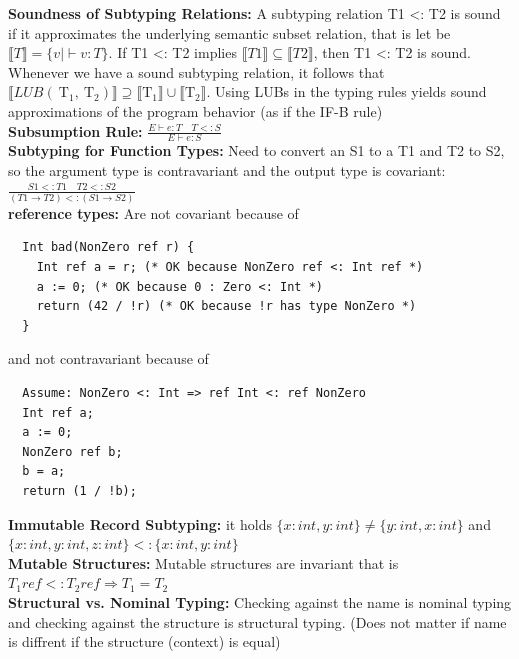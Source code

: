 \documentclass[10pt,landscape]{article}
\begin{document}
\begin{multicols}{3}
\textbf{Soundness of Subtyping Relations:} A subtyping relation T1 <: T2 is sound if it approximates the underlying
semantic subset relation, that is let be $\llbracket T \rrbracket=\{v \mid \vdash v: T\}$. If T1 <: T2 implies $\llbracket T1 \rrbracket \subseteq  \llbracket T2 \rrbracket$, then T1 <: T2 is sound.
Whenever we have a sound subtyping relation, it follows that $\llbracket L U B\left(\mathrm{~T}_1, \mathrm{~T}_2\right) \rrbracket \supseteq \llbracket \mathrm{T}_1 \rrbracket \cup \llbracket \mathrm{T}_2 \rrbracket$.
Using LUBs in the typing rules yields sound approximations of the program behavior (as if the IF-B rule)\\
\textbf{Subsumption Rule:} $\frac{E \vdash e : T \quad  T <:  S}{E \vdash e : S}$\\
\textbf{Subtyping for Function Types:} Need to convert an S1 to a T1 and T2 to S2, so the argument type is
contravariant and the output type is covariant: $\frac{S1 <: T1 \quad T2 <: S2}{(T1 \rightarrow T2) <: (S1 \rightarrow S2)}$\\
\textbf{reference types:} Are not covariant because of 
\begin{verbatim}
  Int bad(NonZero ref r) {
    Int ref a = r; (* OK because NonZero ref <: Int ref *)
    a := 0; (* OK because 0 : Zero <: Int *)
    return (42 / !r) (* OK because !r has type NonZero *)
  }
\end{verbatim}
and not contravariant because of 
\begin{verbatim}
  Assume: NonZero <: Int => ref Int <: ref NonZero
  Int ref a;
  a := 0;
  NonZero ref b;
  b = a;
  return (1 / !b); 
\end{verbatim}
\textbf{Immutable Record Subtyping:} it holds $\{x:int, y :int\} \neq \{y:int, x:int\}$ and $\{x:int, y :int, z:int\} <: \{x:int, y :int\}$\\
\textbf{Mutable Structures:} Mutable structures are invariant that is $T_1 ref <: T_2 ref \Longrightarrow T_1 = T_2$\\
\textbf{Structural vs. Nominal Typing:} Checking against the name is nominal typing and checking against the structure is structural typing. (Does not matter if name is diffrent if the structure (context) is equal)

\end{multicols}
\end{document}
